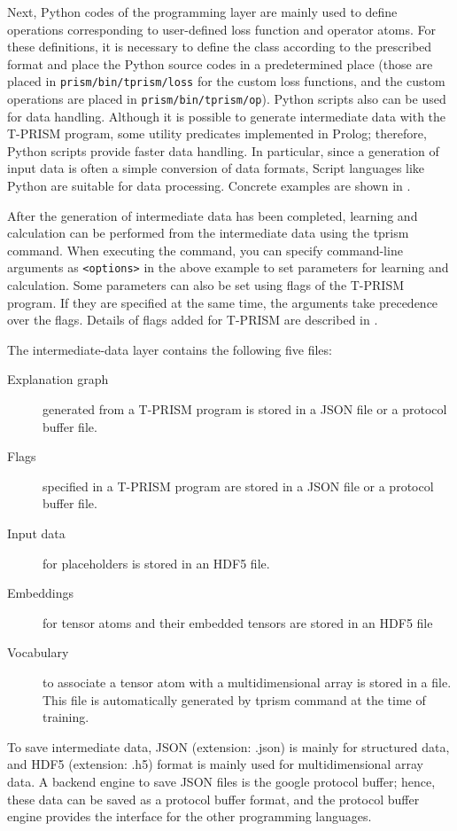 \documentclass[a4paper]{report}
\begin{document}
Next, Python codes of the programming layer are mainly used to define operations corresponding to user-defined loss function and operator atoms.
For these definitions, it is necessary to define the class according to the prescribed format and place the Python source codes in a predetermined place (those are placed in {\tt prism/bin/tprism/loss} for the custom loss functions, and the custom operations are placed in {\tt prism/bin/tprism/op}).
Python scripts also can be used for data handling.
Although it is possible to generate intermediate data with the T-PRISM program,
some utility predicates implemented in Prolog; therefore, Python scripts provide faster data handling.
In particular, since a generation of input data is often a simple conversion of data formats, Script languages like Python are suitable for data processing.
Concrete examples are shown in .


After the generation of intermediate data has been completed, learning and calculation can be performed from the intermediate data using the tprism command.
When executing the command, you can specify command-line arguments as \verb|<options>| in the above example to  set parameters for learning and calculation.
Some parameters can also be set using flags of the T-PRISM program.
If they are specified at the same time, the arguments take precedence over the flags.
Details of flags added for T-PRISM are described in .

The intermediate-data layer contains the following five files:
\begin{description}
	\item[Explanation graph] generated from a T-PRISM program is stored in a JSON file or a protocol buffer file.
	\item[Flags] specified in a T-PRISM program are stored in a JSON file or a protocol buffer file.
	\item[Input data] for placeholders is stored in an HDF5 file.
	\item[Embeddings] for tensor atoms and their embedded tensors are stored in an HDF5 file
	\item[Vocabulary] to associate a tensor atom with a multidimensional array is stored in a file. This file is automatically generated by tprism command at the time of training.
\end{description}
To save intermediate data, JSON (extension: .json) is mainly for structured data, and HDF5 (extension: .h5) format is mainly used for multidimensional array data.
A backend engine to save JSON files is the google protocol buffer; hence, these data can be saved as a protocol buffer format, and the protocol buffer engine provides the interface for the other programming languages.
\end{document}
